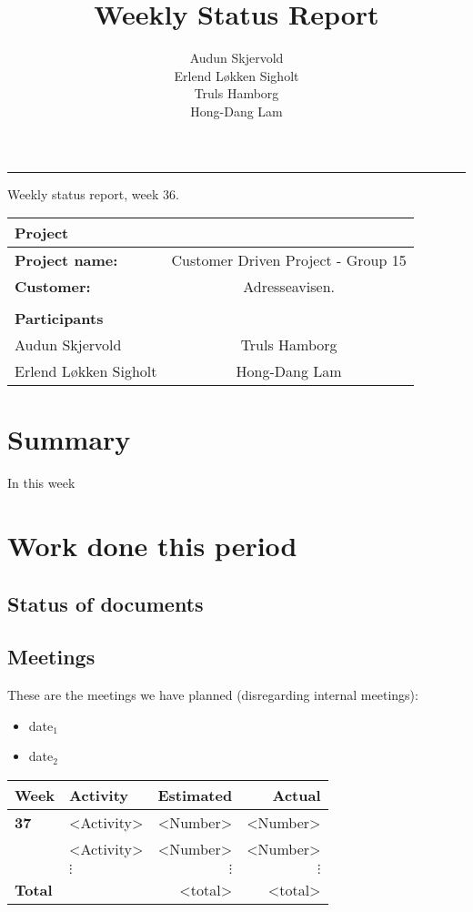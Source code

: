 \documentclass[12pt, a4paper]{article}
\title{Weekly Status Report}
\author{Audun Skjervold \\ Erlend Løkken Sigholt \\ Truls Hamborg \\ Hong-Dang Lam}
\begin{document}
\maketitle
\newpage

 
\newpage
\hrule
\newpage

\begin{center}
Weekly status report, week 36.
  \begin{tabular}{| l  c |}
    \hline
    Project & \\ \hline
    \textbf{Project name:} & Customer Driven Project - Group 15 \\
    \textbf{Customer:} & Adresseavisen. \\ \hline
     & \\
     \textbf{Participants} & \\ \hline
     Audun Skjervold & Truls Hamborg \\
     Erlend Løkken Sigholt & Hong-Dang Lam \\
    \hline
  \end{tabular}
  \end{center}




\section{Summary}
In this week
\section{Work done this period}
\subsection{Status of documents}
\subsection{Meetings}
These are the meetings we have planned (disregarding internal meetings):\\
\begin{itemize}
\item date$_1$
\item date$_2$
\end{itemize}
  \begin{tabular}{| l | l | r | r |}
    \hline
    \textbf{Week} & \textbf{Activity} & \textbf{Estimated} & \textbf{Actual}\\ \hline
    \textbf{37} & <Activity> & <Number> & <Number> \\ \hline
     & <Activity> & <Number> & <Number> \\ \hline
     & $\vdots$ & $\vdots$ & $\vdots$ \\ \hline
     \textbf{Total }&  & <total> & <total> \\
    \hline
  \end{tabular}
\end{document}
